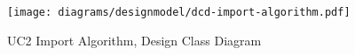 \begin{figure}[p]%
\end{figure}
\begin{figure}[H]
    \centering
    \texttt{[image: diagrams/designmodel/dcd-import-algorithm.pdf]}
    \caption{UC2 Import Algorithm, Design Class Diagram}
    \label{fig:import-algorithm-dcd}
\end{figure}
% 
